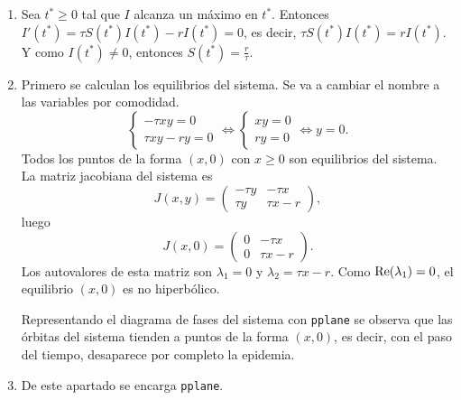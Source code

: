 \documentclass[11pt]{report}
\begin{document}
\begin{solution}
    \hfill
    \begin{enumerate}
        \item Sea $t^* \geq 0$ tal que $I$ alcanza un máximo en $t^*$. Entonces $I'(t^*) = \tau S(t^*)I(t^*)-rI(t^*) = 0$, es decir, $\tau S(t^*)I(t^*) = rI(t^*)$. Y como $I(t^*) \neq 0$, entonces $S(t^*) = \frac{r}{\tau}$.
        \item Primero se calculan los equilibrios del sistema. Se va a cambiar el nombre a las variables por comodidad.
        \[\begin{cases}
            -\tau xy = 0 \\
            \tau xy - ry = 0 
        \end{cases} \iff 
        \begin{cases}
            xy = 0 \\
            ry = 0
        \end{cases} \iff y = 0.\]
        Todos los puntos de la forma $(x,0)$ con $x \geq 0$ son equilibrios del sistema. La matriz jacobiana del sistema es
        \[J(x,y) = \left(\begin{array}{cc}
            -\tau y & -\tau x \\
            \tau y & \tau x -r
        \end{array}\right),\]
        luego 
        \[J(x,0) = \left(\begin{array}{cc}
            0 & -\tau x \\
            0 & \tau x -r
        \end{array}\right).\]
        Los autovalores de esta matriz son $\lambda_1 = 0$ y $\lambda_2 = \tau x -r$. Como $\textup{Re}(\lambda_1) = 0$, el equilibrio $(x,0)$ es no hiperbólico.

        Representando el diagrama de fases del sistema con \texttt{pplane} se observa que las órbitas del sistema tienden a puntos de la forma $(x,0)$, es decir, con el paso del tiempo, desaparece por completo la epidemia.
        \item De este apartado se encarga \texttt{pplane}.
    \end{enumerate}
\end{solution}
\end{document}
